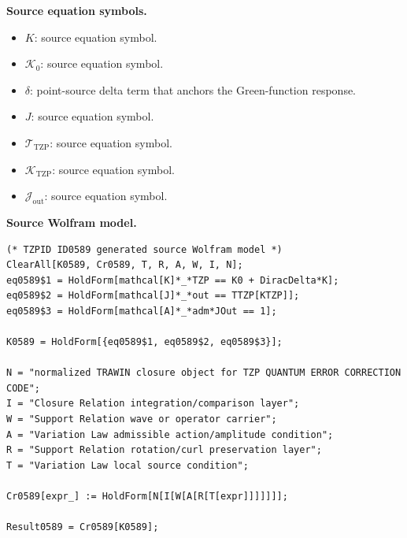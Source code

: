 \begin{minipage}[t]{0.49\linewidth}
\begingroup
\small
\raggedright
\textbf{Source equation symbols.}\par
\begin{itemize}[leftmargin=1.35em,itemsep=1pt,topsep=1pt,parsep=0pt]
    \item $K$: source equation symbol.
    \item $\mathcal{K}_0$: source equation symbol.
    \item $\delta$: point-source delta term that anchors the Green-function response.
    \item $J$: source equation symbol.
    \item $\mathcal{T}_{\mathrm{TZP}}$: source equation symbol.
    \item $\mathcal{K}_{\mathrm{TZP}}$: source equation symbol.
    \item $\mathcal{J}_{\mathrm{out}}$: source equation symbol.
\end{itemize}
\endgroup
\end{minipage}\hfill
\begin{minipage}[t]{0.47\linewidth}
\begingroup
\scriptsize
\raggedright
\textbf{Source Wolfram model.}\par
\begin{Verbatim}[fontsize=\tiny,breaklines=true,breakanywhere=true]
(* TZPID ID0589 generated source Wolfram model *)
ClearAll[K0589, Cr0589, T, R, A, W, I, N];
eq0589$1 = HoldForm[mathcal[K]*_*TZP == K0 + DiracDelta*K];
eq0589$2 = HoldForm[mathcal[J]*_*out == TTZP[KTZP]];
eq0589$3 = HoldForm[mathcal[A]*_*adm*JOut == 1];

K0589 = HoldForm[{eq0589$1, eq0589$2, eq0589$3}];

N = "normalized TRAWIN closure object for TZP QUANTUM ERROR CORRECTION CODE";
I = "Closure Relation integration/comparison layer";
W = "Support Relation wave or operator carrier";
A = "Variation Law admissible action/amplitude condition";
R = "Support Relation rotation/curl preservation layer";
T = "Variation Law local source condition";

Cr0589[expr_] := HoldForm[N[I[W[A[R[T[expr]]]]]]];

Result0589 = Cr0589[K0589];
\end{Verbatim}
\endgroup
\end{minipage}

